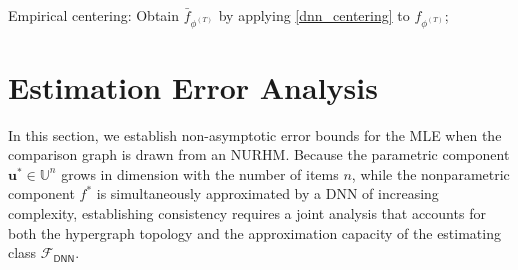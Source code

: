 \documentclass[
  12pt]{article}
\begin{document}
\begin{algorithm}[htb!]
\caption{Parameter Estimation in DHR using Projected SGD}
\label{alg:ranking_sgd}
\SetAlgoLined
\SetAlgoNoEnd 
{}
Empirical centering: Obtain $\bar{f}_{\phi^{(T)}}$ by applying \eqref{dnn_centering} to $f_{\phi^{(T)}}$;

\end{algorithm}




\section{Estimation Error Analysis}\label{sec:theory}

In this section, we establish non-asymptotic error bounds for the MLE when the comparison graph is drawn from an NURHM. 
Because the parametric component $\boldsymbol{u}^*\in\mathbb{U}^n$ grows in 
dimension with the number of items $n$, while the nonparametric component $f^*$ is simultaneously approximated by a DNN of increasing complexity, establishing consistency requires a joint analysis that accounts for both the hypergraph topology and the approximation capacity of the estimating class $\mathcal{F}_{\mathsf{DNN}}$. 
\end{document}
